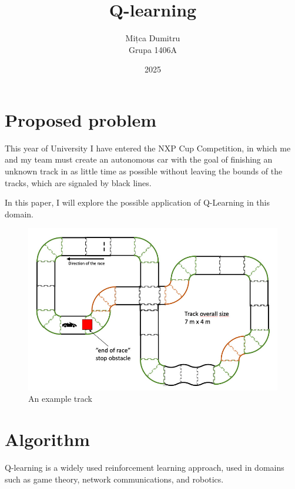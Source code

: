 \documentclass[12pt]{article}
\title{Q-learning}
\author{
  Mițca Dumitru\\
  Grupa 1406A
}
\date{2025}
\begin{document}
\maketitle

\hypersetup{linkbordercolor=1 1 1}
\tableofcontents
\hypersetup{linkbordercolor=1 0 0}

\singlespacing
\newpage

\section{Proposed problem}

This year of University I have entered the NXP Cup Competition, in which me and my team must
create an autonomous car with the goal of finishing an unknown track in as little time
as possible without leaving the bounds of the tracks, which are signaled by black lines.

In this paper, I will explore the possible application of Q-Learning in this domain.

\begin{figure}
  \includegraphics[width=\linewidth]{nxp-track}
  \caption{An example track\protect\footnotemark}
\end{figure}

 \cite[p.~9]{NxpCupRules:2025}

\newpage

\section{Algorithm}

Q-learning is a widely used reinforcement learning approach, used in domains such as game theory,
network communications, and robotics\cite{8836506}.
\end{document}
